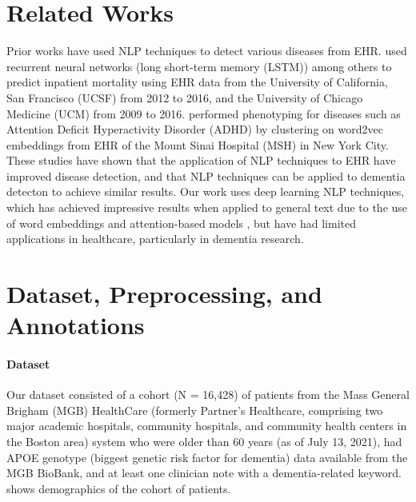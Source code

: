 \documentclass[pmlr,twocolumn,10pt]{jmlr} %
\begin{document}
\section{Related Works}
\label{sec:RelatedWorks} 
Prior works have used NLP techniques to detect various diseases from EHR. \citep{rajkomar2018scalable} %
used recurrent neural networks (long short-term memory (LSTM)) among others to predict inpatient mortality using EHR data from the University of California, San Francisco (UCSF) from 2012 to 2016, and the University of Chicago Medicine (UCM) from 2009 to 2016.  \citep{glicksberg2018automated} %
performed phenotyping for diseases such as Attention Deficit Hyperactivity Disorder (ADHD) by clustering on word2vec embeddings from EHR of the Mount Sinai Hospital (MSH) in New York City. These studies have shown that the application of NLP techniques to EHR have improved disease detection, and that NLP techniques can be applied to dementia detecton to achieve similar results. Our work uses deep learning NLP techniques, which has achieved impressive results when applied to general text due to the use of word embeddings and attention-based models \citep{vaswani2017attention,mikolov2013distributed,pennington2014glove,peters2018deep, devlin2018bert}, but have had limited applications in healthcare, particularly in dementia research. 

\section{Dataset, Preprocessing, and Annotations}
\label{sec:Dataset+Preprocessing+Annotations}

\paragraph{Dataset}
\label{sec:Dataset} Our dataset consisted of a cohort (N = 16,428) of patients from the Mass General Brigham (MGB) HealthCare (formerly Partner's Healthcare, comprising two major academic hospitals, community hospitals, and community health centers in the Boston area) system who were older than 60 years (as of July 13, 2021), had APOE genotype \citep{mahley2000apolipoprotein} (biggest genetic risk factor for dementia) data available from the MGB BioBank, and at least one clinician note with a dementia-related keyword.  shows demographics of the cohort of patients.   
\end{document}
